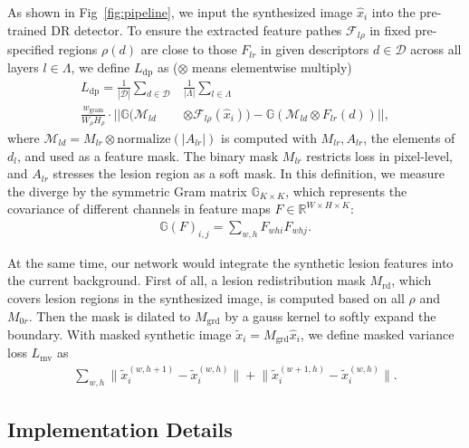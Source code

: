 \documentclass[letterpaper]{article} %
\begin{document}
    As shown in  Fig~\ref{fig:pipeline}, we input the synthesized image $ \hat x_i $ into the pre-trained DR detector.
    To ensure the extracted feature pathes $ \mathcal{F}_{l\rho} $ in fixed pre-specified regions $ \rho(d) $ are close to those $ F_{lr} $ in given descriptors $ d \in \mathcal{D} $ across all layers $ l \in \Lambda $, we define $ L_\mathrm{dp}$ as ($ \otimes $ means elementwise multiply)
    \begin{align}
    \label{align_dp_loss} \textstyle
    L_\mathrm{dp} = \frac{1}{|\mathcal{D}|} \sum_{d\in \mathcal{D}} &\textstyle \frac{1}{|\Lambda|} \sum_{l \in \Lambda}\nonumber \\ \textstyle \frac{w_\mathrm{gram}}{W_\rho H_\rho} \cdot
    || \mathbb{G}(\mathcal{M}_{ld}& \otimes  \mathcal{F}_{l\rho}(\hat x_i))
    - \mathbb{G}(\mathcal{M}_{ld} \otimes F_{lr}(d)) ||,
    \end{align}
	where $ \mathcal{M}_{ld} = M_{lr} \otimes \mathrm{normalize}(|A_{lr}|) $ is computed with $ M_{lr}, A_{lr}$, the elements of $ d_l $, and used as a feature mask. The binary mask $ M_{lr} $ restricts loss in pixel-level, and $ A_{lr} $ stresses the lesion region as a soft mask.
	In this definition, we measure the diverge by the symmetric Gram matrix $ \mathbb{G}_{K\times K} $, which represents the covariance of different channels in feature maps $ F \in \mathbb{R}^{W\times H\times K}$:
	\begin{align}
	\label{align_gram} \textstyle
	\mathbb{G}(F)_{i, j} = \sum_{w,h} F_{whi}F_{whj}.
	\end{align}

	At the same time, our network would integrate the synthetic lesion features into the current background. First of all, a lesion redistribution mask $ M_\mathrm{rd} $, which covers lesion regions in the synthesized image, is computed based on all $ \rho $ and $ M_{0r} $. Then the mask is dilated to $ M_\mathrm{grd} $ by a gauss kernel to softly expand the boundary. With masked synthetic image $ \tilde{x}_i = M_\mathrm{grd} \hat{x}_i $, we define masked variance loss $L_\mathrm{mv}$ as
	\begin{align}
	\label{align_mtv_loss} \textstyle
	\sum_{w,h}{\lVert \tilde{x}_i^{(w,h+1)} - \tilde{x}_i^{(w,h)} \lVert}
	+ {\lVert \tilde{x}_i^{(w+1,h)} - \tilde{x}_i^{(w,h)} \lVert}.
	\end{align}







	\subsection{Implementation Details}
\end{document}
